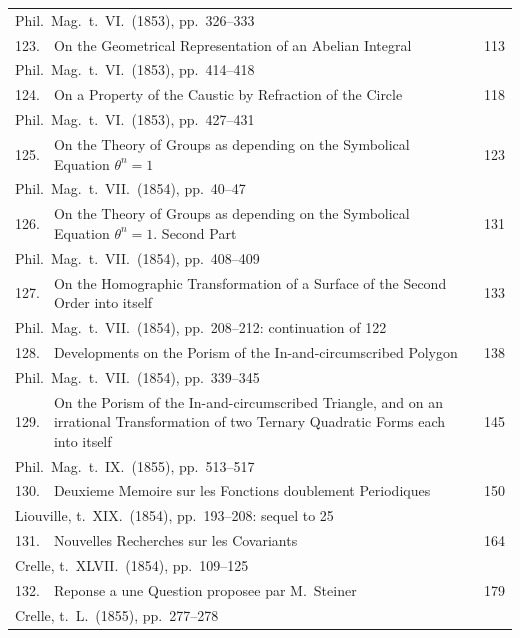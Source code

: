 \documentclass[11pt,a4paper]{book}
\begin{document}
\begin{longtable}{rp{8cm}l}
\multicolumn{3}{l}{\small Phil.\ Mag.\ t.\ VI.\ (1853), pp.\ 326--333}\\[0.5em]
123. & On the Geometrical Representation of an Abelian Integral & 113\\
\multicolumn{3}{l}{\small Phil.\ Mag.\ t.\ VI.\ (1853), pp.\ 414--418}\\[0.5em]
124. & On a Property of the Caustic by Refraction of the Circle & 118\\
\multicolumn{3}{l}{\small Phil.\ Mag.\ t.\ VI.\ (1853), pp.\ 427--431}\\[0.5em]
125. & On the Theory of Groups as depending on the Symbolical Equation $\theta^n = 1$ & 123\\
\multicolumn{3}{l}{\small Phil.\ Mag.\ t.\ VII.\ (1854), pp.\ 40--47}\\[0.5em]
126. & On the Theory of Groups as depending on the Symbolical Equation $\theta^n = 1$. Second Part & 131\\
\multicolumn{3}{l}{\small Phil.\ Mag.\ t.\ VII.\ (1854), pp.\ 408--409}\\[0.5em]
127. & On the Homographic Transformation of a Surface of the Second Order into itself & 133\\
\multicolumn{3}{l}{\small Phil.\ Mag.\ t.\ VII.\ (1854), pp.\ 208--212: continuation of 122}\\[0.5em]
128. & Developments on the Porism of the In-and-circumscribed Polygon & 138\\
\multicolumn{3}{l}{\small Phil.\ Mag.\ t.\ VII.\ (1854), pp.\ 339--345}\\[0.5em]
129. & On the Porism of the In-and-circumscribed Triangle, and on an irrational Transformation of two Ternary Quadratic Forms each into itself & 145\\
\multicolumn{3}{l}{\small Phil.\ Mag.\ t.\ IX.\ (1855), pp.\ 513--517}\\[0.5em]
130. & Deuxieme Memoire sur les Fonctions doublement Periodiques & 150\\
\multicolumn{3}{l}{\small Liouville, t.\ XIX.\ (1854), pp.\ 193--208: sequel to 25}\\[0.5em]
131. & Nouvelles Recherches sur les Covariants & 164\\
\multicolumn{3}{l}{\small Crelle, t.\ XLVII.\ (1854), pp.\ 109--125}\\[0.5em]
132. & Reponse a une Question proposee par M.\ Steiner & 179\\
\multicolumn{3}{l}{\small Crelle, t.\ L.\ (1855), pp.\ 277--278}\\[0.5em]

\end{longtable}
\end{document}
